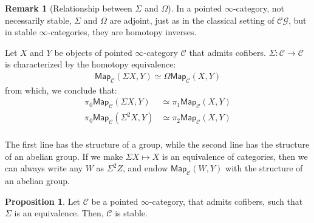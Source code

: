 \documentclass[10pt]{amsart}
\newcommand{\8}{\ensuremath{\infty}}
\newcommand{\0}{\ensuremath{\overset{\rightarrow}{0}}}
\newcommand{\1}{\ensuremath{\mathbf{1}}}
\newcommand{\C}{\ensuremath{\mathscr{C}}}
\newcommand{\CG}{\ensuremath{\mathscr{CG}}}
\newcommand{\Map}{\ensuremath{\mathsf{Map}}}
\theoremstyle{definition}
\newtheorem{proposition}[definition]{Proposition}
\newtheorem{remark}[definition]{Remark}
\numberwithin{definition}{subsection}
\numberwithin{definition}{section}
\begin{document}
\begin{remark}[Relationship between $\Sigma$ and $\Omega$]
  In a pointed \8-category, not necessarily stable, $\Sigma$ and $\Omega$ are adjoint, just as in the classical setting of \CG, but in stable \8-categories, they are homotopy inverses.

  Let $X$ and $Y$ be objects of pointed \8-category $\C$ that admits cofibers. $\Sigma : \C \rightarrow \C$ is characterized by the homotopy equivalence:
  \begin{align*}
    \Map_\C(\Sigma X, Y) \simeq \Omega \Map_\C(X, Y)
  \end{align*}
  from which, we conclude that:
  \begin{align*}
    \pi_0 \Map_\C(\Sigma X, Y)   & \simeq \pi_1 \Map_\C(X, Y) \\
    \pi_0 \Map_\C(\Sigma^2 X, Y) & \simeq \pi_2 \Map_\C(X, Y) \\
  \end{align*}

  The first line has the structure of a group, while the second line has the structure of an abelian group. If we make $\Sigma X \mapsto X$ is an equivalence of categories, then we can always write any $W$ as $\Sigma^2 Z$, and endow $\Map_\C(W, Y)$ with the structure of an abelian group.
\end{remark}

\begin{proposition}
  Let $\C$ be a pointed \8-category, that admits cofibers, such that $\Sigma$ is an equivalence. Then, $\C$ is stable.
\end{proposition}

\newpage
\end{document}
